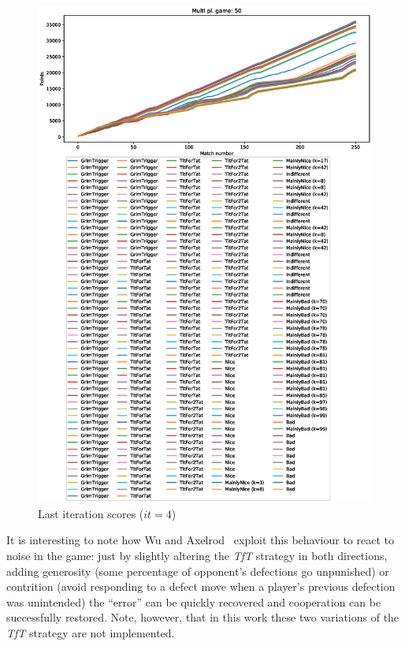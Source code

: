 \documentclass[journal,a4paper,10pt,twoside]{IEEEtran} %
\begin{document}
\begin{figure}[!ht]
    \centering
    \includegraphics[width=1\columnwidth]{../img/ripdmp-incr/ripdmp-scores-increasing-pop-50-r4}
    \caption{Last iteration scores ($it=4$)}
    \label{fig:incrLI}
\end{figure}

It is interesting to note how Wu and Axelrod~\cite{IPDnoise} exploit this behaviour to react to noise in the game: just by slightly altering the \textit{TfT} strategy in both directions, adding generosity (some percentage of opponent's defections go unpunished) or contrition (avoid responding to a defect move when a player's previous defection was unintended) the ``error'' can be quickly recovered and cooperation can be successfully restored. Note, however, that in this work these two variations of the \textit{TfT} strategy are not implemented.
\end{document}
